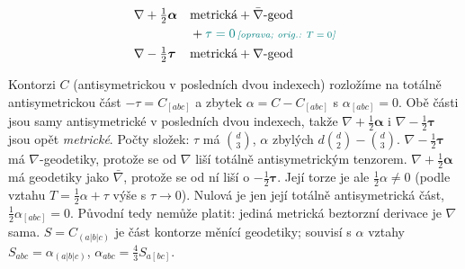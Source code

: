 \begin{minipage}{0.52\textwidth}
\end{minipage}
\hfill
\begin{minipage}{0.46\textwidth}
\begin{align*}
  &\nabla + \tfrac12\boldsymbol\alpha && \text{metrická} + \bar\nabla\text{-geod} \\
  & && {}+ \oprava{\tau = 0}{T = 0} \\
  &\nabla - \tfrac12\boldsymbol\tau && \text{metrická} + \nabla\text{-geod}
\end{align*}
\end{minipage}

\begin{vysvetleni}
Kontorzi $C$ (antisymetrickou v posledních dvou indexech) rozložíme na totálně antisymetrickou část $-\tau=C_{[abc]}$ a zbytek $\alpha=C-C_{[abc]}$ s $\alpha_{[abc]}=0$. Obě části jsou samy antisymetrické v posledních dvou indexech, takže $\nabla+\tfrac12\boldsymbol\alpha$ i $\nabla-\tfrac12\boldsymbol\tau$ jsou opět \emph{metrické}. Počty složek: $\tau$ má $\binom d3$, $\alpha$ zbylých $d\binom d2-\binom d3$.
$\nabla-\tfrac12\boldsymbol\tau$ má $\nabla$-geodetiky, protože se od $\nabla$ liší totálně antisymetrickým tenzorem. $\nabla+\tfrac12\boldsymbol\alpha$ má geodetiky jako $\bar\nabla$, protože se od ní liší o $-\tfrac12\boldsymbol\tau$. Její torze je ale $\tfrac12\alpha\neq0$ (podle vztahu $T=\tfrac12\alpha+\tau$ výše s $\tau\to0$). Nulová je jen její totálně antisymetrická část, $\tfrac12\alpha_{[abc]}=0$. Původní  tedy nemůže platit: jediná metrická beztorzní derivace je $\nabla$ sama.
$S=C_{(a|b|c)}$ je část kontorze měnící geodetiky; souvisí s $\alpha$ vztahy $S_{abc}=\alpha_{(a|b|c)}$, $\alpha_{abc}=\tfrac43S_{a[bc]}$.
\end{vysvetleni}

